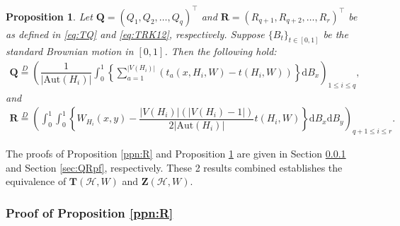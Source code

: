 \documentclass[11pt,reqno]{amsart}
\numberwithin{equation}{section}
\newtheorem{prop}{Proposition}[section]
\theoremstyle{definition}
\begin{document}
\begin{prop}\label{ppn:QR} Let $\bm Q = (Q_1, Q_2, \ldots, Q_q)^\top$ and ${\bm R} = (R_{q+1}, R_{q+2}, \ldots, R_r)^\top$ be as defined in \eqref{eq:TQ} and \eqref{eq:TRK12}, respectively. Suppose $\{B_{t}\}_{t\in [0,1]}$ be the standard Brownian motion in $[0, 1]$. Then the following hold: 
\begin{align}\label{eq:QBx}
\bm Q \stackrel{D} = \left( \dfrac{1}{|\mathrm{Aut}(H_{i})|}  \int_{0}^{1} \left\{ \sum_{a=1}^{|V(H_{i})|} \left( t_{a}(x,H_{i},W) - t(H_{i},W) \right) \right\} \mathrm d B_{x} \right)_{1 \leq i \leq q}, 
\end{align} 
and 
\begin{align}\label{eq:RBx}
\bm R \stackrel{D} = \left(\int_{0}^{1}\int_{0}^{1} \left\{ W_{H_{i}}(x,y) - \dfrac{|V(H_{i})|\left(|V(H_{i})-1|\right)}{2|\mathrm{Aut}(H_{i})|}t(H_{i},W) \right \} \mathrm d B_{x}\mathrm d B_{y} \right)_{ q+1 \leq i \leq r} . 
\end{align}
\end{prop}



The proofs of Proposition \ref{ppn:R} and Proposition \ref{ppn:QR} are given in Section \ref{sec:Rpf} and Section \ref{sec:QRpf}, respectively.  These 2 results combined establishes the equivalence of $\bm{T}(\mathcal{H}, W)$ and $\bm{Z}(\mathcal{H}, W)$. 



\subsubsection{Proof of Proposition \ref{ppn:R}}
\label{sec:Rpf}
\end{document}

